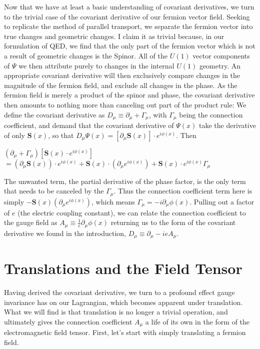 \documentclass{article}
\begin{document}
        Now that we have at least a basic understanding of covariant derivatives, we turn to the trivial case of the covariant derivative of our fermion vector field. Seeking to replicate the method of parallel transport, we separate the fermion vector into true changes and geometric changes. I claim it as trivial because, in our formulation of QED, we find that the only part of the fermion vector which is not a result of geometric changes is the Spinor. All of the $U(1)$ vector components of $\Psi$ we then attribute purely to changes in the internal $U(1)$ geometry. An appropriate covariant derivative will then exclusively compare changes in the magnitude of the fermion field, and exclude all changes in the phase. As the fermion field is merely a product of the spinor and phase, the covariant derivative then amounts to nothing more than canceling out part of the product rule:
        We define the covariant derivative as $ D_\mu \equiv \partial_\mu + \Gamma_\mu $, with $\Gamma_\mu$ being the connection coefficient,
        and demand that the covariant derivative of $ \Psi(x) $ take the derivative of only $\mathbf{S}(x)$, so that
        $D_\mu \Psi(x) = [ \partial_\mu \mathbf{S}(x) ] \cdot e^{i\phi(x)} $. Then

        \vspace{5pt}
        $ (\partial_\mu + \Gamma_\mu) [ \mathbf{S}(x) \cdot e^{i\phi(x)} ] $ 
        $ = (\partial_\mu \mathbf{S}(x) ) \cdot e^{i\phi(x)} +
             \mathbf{S}(x)  \cdot (\partial_\mu e^{i\phi(x)}) +
             \mathbf{S}(x)  \cdot e^{i\phi(x)} \Gamma_\mu $
        \vspace{5pt}

        The unwanted term, the partial derivative of the phase factor, is the only term that needs to be canceled by the $\Gamma_\mu$. Thus the connection coefficient term here is simply $ -  \mathbf{S}(x)  (\partial_\mu e^{i\phi(x)})  $, which means 
        $\Gamma_\mu = - i \partial_\mu \phi(x) $. Pulling out a factor of $e$ (the electric coupling constant), we can relate the connection coefficient to the gauge field
        as $A_\mu \equiv \frac{1}{e} \partial_\mu \phi(x)$ returning us to the form of the covariant derivative we found in the introduction,
        $ D_\mu \equiv \partial_\mu - i e A_\mu $.


\section{Translations and the Field Tensor}
        Having derived the covariant derivative, we turn to a profound effect gauge invariance has on our Lagrangian, which becomes apparent under translation. What we will find is that translation is no longer a trivial operation, and ultimately gives the connection coefficient $A_\mu$ a life of its own in the form of the electromagnetic field tensor. First, let's start with simply translating a fermion field.
        
\end{document}
